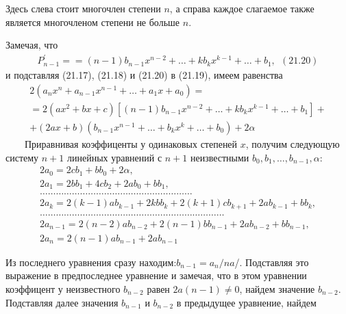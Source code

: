 \documentclass{article}
\begin{document}
 
Здесь слева стоит многочлен степени $\displaystyle n$, а справа каждое слагаемое также является многочленом степени не больше $\displaystyle n$.
\par
Замечая, что
\begin{gather*} P_{n-1}^{'}=
=(n-1)b_{n-1}x^{n-2}+\ldots +kb_{k}x^{k-1}+\ldots+b_1, \ \ (21.20)\end{gather*}
и подставляя (21.17), (21.18) и (21.20) в (21.19), имеем равенства
\begin{gather*} 2(a_nx^n+a_{n-1}x^{n-1}+\ldots +a_1x+a_0)=
\\
=2(ax^2+bx+c)[(n-1)b_{n-1}x^{n-2}+\ldots +kb_{k}x^{k-1}+\ldots+b_1]+
\\
+(2ax+b)(b_{n-1}x^{n-1}+\ldots +b_{k}x^{k}+\ldots +b_0)+2\alpha\end{gather*}
\ \ \ \ Приравнивая коэффиценты у одинаковых степеней $\displaystyle x$, получим следующую систему $\displaystyle n+1$ линейных уравнений с $\displaystyle n+1$ неизвестными $\displaystyle b_0,b_1,\ldots,b_{n-1},\alpha:$
\begin{gather*} 2a_0=2cb_1+bb_0+2\alpha,
\\
2a_1=2bb_1+4cb_2+2ab_0+bb_1,
\\
\ldots\ldots\ldots\ldots\ldots\ldots\ldots\ldots\ldots\ldots\ldots\ldots\ldots\ldots\ldots\ldots\ldots\ldots\ldots
\\
 2a_k=2(k-1)ab_{k-1}+2kbb_k+2(k+1)cb_{k+1}+2ab_{k-1}+bb_k,
\\
\ldots\ldots\ldots\ldots\ldots\ldots\ldots\ldots\ldots\ldots\ldots\ldots\ldots\ldots\ldots\ldots\ldots\ldots\ldots\ldots\ldots\ldots\ldots
\\
2a_{n-1}=2(n-2)ab_{n-2}+2(n-1)bb_{n-1}+2ab_{n-2}+bb_{n-1},
\\
2a_n=2(n-1)ab_{n-1}+2ab_{n-1}\end{gather*}

Из последнего уравнения сразу находим:$\displaystyle b_{n-1}=a_n/na$/. Подставляя это выражение в предпоследнее уравнение и замечая, что в этом уравнении коэффицент у неизвестного $\displaystyle b_{n-2}$ равен $\displaystyle 2a(n-1)\ne0$, найдем значение $\displaystyle b_{n-2}$. Подставляя далее значения $\displaystyle b_{n-1}$ и $\displaystyle b_{n-2}$ в предыдущее уравнение, найдем
 
  
  
\end{document}
